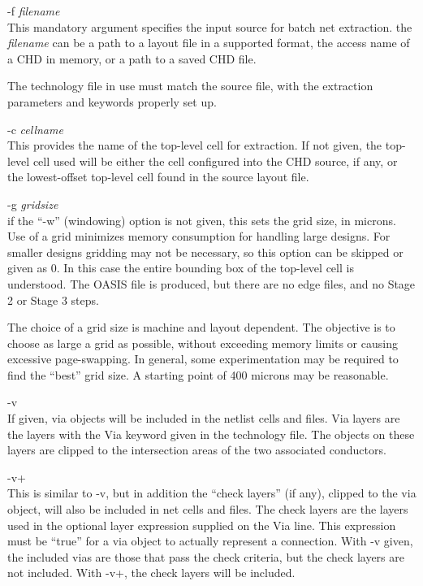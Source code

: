 \begin{description}
\item{\vt -f} {\it filename}\\
This mandatory argument specifies the input source for batch net
extraction.  the {\it filename} can be a path to a layout file in a
supported format, the access name of a CHD in memory, or a path to a
saved CHD file.

The technology file in use must match the source file, with the
extraction parameters and keywords properly set up.

\item{\vt -c} {\it cellname}\\
This provides the name of the top-level cell for extraction.  If not
given, the top-level cell used will be either the cell configured into
the CHD source, if any, or the lowest-offset top-level cell found in
the source layout file.

\item{\vt -g} {\it gridsize}\\
if the ``{\vt -w}'' (windowing) option is not given, this sets the
grid size, in microns.  Use of a grid minimizes memory consumption for
handling large designs.  For smaller designs gridding may not be
necessary, so this option can be skipped or given as 0.  In this case
the entire bounding box of the top-level cell is understood.  The
OASIS file is produced, but there are no edge files, and no Stage 2 or
Stage 3 steps.

The choice of a grid size is machine and layout dependent.  The
objective is to choose as large a grid as possible, without exceeding
memory limits or causing excessive page-swapping.  In general, some
experimentation may be required to find the ``best'' grid size.  A
starting point of 400 microns may be reasonable.

\item{\vt -v}\\
If given, via objects will be included in the netlist cells and files. 
Via layers are the layers with the {\et Via} keyword given in the
technology file.  The objects on these layers are clipped to the
intersection areas of the two associated conductors.

\item{\vt -v+}\\
This is similar to {\vt -v}, but in addition the ``check layers'' (if
any), clipped to the via object, will also be included in net cells
and files.  The check layers are the layers used in the optional layer
expression supplied on the {\vt Via} line.  This expression must be
``true'' for a via object to actually represent a connection.  With
{\vt -v} given, the included vias are those that pass the check
criteria, but the check layers are not included.  With {\vt -v+}, the
check layers will be included.


\end{description}
